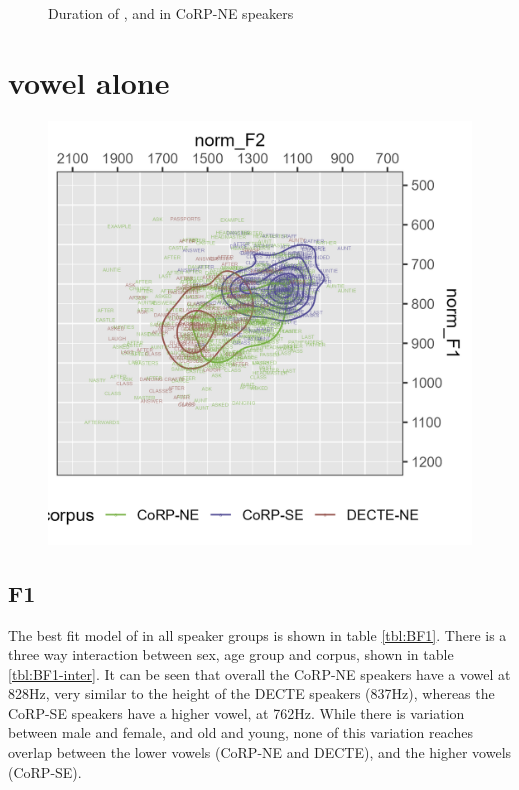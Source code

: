 \documentclass[../../../00.FullDoc/tex/ThesisSkeleton-draft2]{subfiles}
\begin{document}
\begin{figure}[h]
	
	\caption{Duration of \trap{}, \bath{} and \palm{} in CoRP-NE speakers} \label{fig:TBdurNE}
\end{figure}



\section{ vowel alone}

\begin{figure}[h]
	\includegraphics[width=\textwidth]{../figures/B-vplot.png}
	\caption{\bath{}} \label{fig:Bvplot}
\end{figure}



\subsection{F1}
The best fit model of \bath{} in all speaker groups is shown in table \ref{tbl:BF1}. There is a three way interaction between sex, age group and corpus, shown in table \ref{tbl:BF1-inter}. It can be seen that overall the CoRP-NE speakers have a \bath{} vowel at 828Hz, very similar to the height of the DECTE speakers (837Hz), whereas the CoRP-SE speakers have a higher vowel, at 762Hz. While there is variation between male and female, and old and young, none of this variation reaches overlap between the lower vowels (CoRP-NE and DECTE), and the higher vowels (CoRP-SE).
\end{document}
